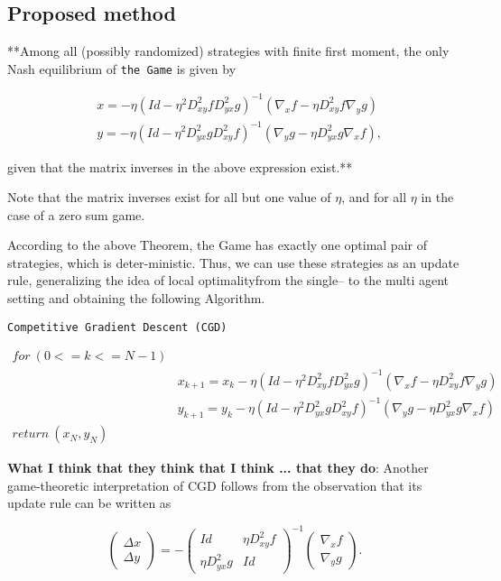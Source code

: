 \documentclass[11pt]{article}
\begin{document}
    \subsection{Proposed method}\label{proposed-method}

**Among all (possibly randomized) strategies with finite first moment,
the only Nash equilibrium of \texttt{the\ Game} is given by

\begin{align}
\label{eqn:nash}
&x = -\eta \left( Id - \eta^2 D_{xy}^2f D_{yx}^2 g \right)^{-1}  
            \left( \nabla_{x} f - \eta D_{xy}^2f  \nabla_{y} g \right) \\
&y = -\eta \left( Id - \eta^2 D_{yx}^2g D_{xy}^2 f \right)^{-1}  
            \left( \nabla_{y} g - \eta D_{yx}^2g  \nabla_{x} f \right),
\end{align}

given that the matrix inverses in the above expression exist.**

Note that the matrix inverses exist for all but one value of \(\eta\),
and for all \(\eta\) in the case of a zero sum game.

According to the above Theorem, the Game has exactly one optimal pair of
strategies, which is deter-ministic. Thus, we can use these strategies
as an update rule, generalizing the idea of local optimalityfrom the
single-- to the multi agent setting and obtaining the following
Algorithm.

\texttt{Competitive\ Gradient\ Descent\ (CGD)}

\begin{align}
for\ (0 <= k <= N-1)\\
&x_{k+1}  = x_{k} - \eta \left( Id - \eta^2 D_{xy}^2f D_{yx}^2 g \right)^{-1}\left( \nabla_{x} f - \eta D_{xy}^2f  \nabla_{y} g \right)\\
&y_{k+1} = y_{k} - \eta \left( Id - \eta^2 D_{yx}^2g D_{xy}^2 f \right)^{-1}  
    \left( \nabla_{y} g - \eta D_{yx}^2g  \nabla_{x} f \right)\\
    return\ (x_{N},y_{N})\;
\end{align}

\textbf{What I think that they think that I think ... that they do}:
Another game-theoretic interpretation of CGD follows from the
observation that its update rule can be written as

\begin{equation}
\label{eqn:whatIthink}
    \begin{pmatrix}
         \Delta x\\
         \Delta y
    \end{pmatrix}
    =  
    -
    \begin{pmatrix}
        Id        & \eta D_{xy}^2 f \\
        \eta D_{yx}^2 g & Id        
    \end{pmatrix}^{-1}
    \begin{pmatrix}
         \nabla_{x} f\\
         \nabla_{y} g
    \end{pmatrix}.
\end{equation}
\end{document}
